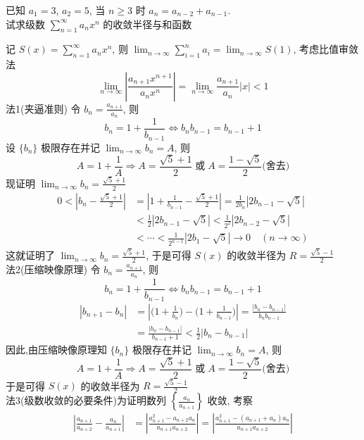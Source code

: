 \documentclass[color=green,titlestyle=hang]{elegantbook}%
\begin{document}
\begin{exercise}
已知 $a_1=3$, $a_2=5$, 当 $n\geqslant3$ 时 $a_n=a_{n-2}+a_{n-1}$. \\
试求级数 $\sum_{n=1}^{\infty}a_nx^n$ 的收敛半径与和函数 %
\end{exercise}\begin{solution}
记 $S(x)=\sum_{n=1}^{\infty}a_nx^n$, 则 $\lim_{n\to\infty}\sum_{i=1}^{n}a_i=\lim_{n\to\infty}S(1)$, 考虑比值审敛法
\[\lim_{n\to\infty}\left|\frac{a_{n+1}x^{n+1}}{a_nx^n}\right|=\lim_{n\to\infty}\frac{a_{n+1}}{a_n}|x|<1\]
法1(夹逼准则) 令 $b_n=\frac{a_{n+1}}{a_n}$, 则 
\[b_n=1+\frac{1}{b_{n-1}}\Longleftrightarrow b_nb_{n-1}=b_{n-1}+1\]
设 $\{b_n\}$ 极限存在并记 $\lim_{n\to\infty}b_n=A$, 则\[A=1+\frac{1}{A}\Longrightarrow A=\frac{\sqrt{5}+1}{2}\;\text{或}\;A=\frac{1-\sqrt{5}}{2}\text{(舍去)}\]
现证明  $\lim_{n\to\infty}b_n=\frac{\sqrt{5}+1}{2}$
\begin{align*}
0<\left|b_n-\frac{\sqrt{5}+1}{2}\right|&=\left|1+\frac{1}{b_{n-1}}-\frac{\sqrt{5}+1}{2}\right|
=\frac{1}{2b_n}\left|2b_{n-1}-\sqrt{5}\right|\\
&<\frac{1}{2}\left|2b_{n-1}-\sqrt{5}\right|<\frac{1}{2^2}\left|2b_{n-2}-\sqrt{5}\right|\\
&<\cdots<\frac{1}{2^{n-1}}\left|2b_{1}-\sqrt{5}\right|\to0\quad(n\to\infty)
\end{align*}
这就证明了 $\lim_{n\to\infty}b_n=\frac{\sqrt{5}+1}{2}$, 于是可得 $S(x)$ 的收敛半径为 $R=\frac{\sqrt{5}-1}{2}$\\
法2(压缩映像原理) 令 $b_n=\frac{a_{n+1}}{a_n}$, 则 
\[b_n=1+\frac{1}{b_{n-1}}\Longleftrightarrow b_nb_{n-1}=b_{n-1}+1\]
\begin{align*}
|b_{n+1}-b_n|&=\left|\Big(1+\frac{1}{b_{n}}\Big)-\Big(1+\frac{1}{b_{n-1}}\Big)\right|
=\frac{|b_n-b_{n-1}|}{b_nb_{n-1}}\\
&=\frac{|b_n-b_{n-1}|}{b_{n-1}+1}<\frac{1}{2}|b_n-b_{n-1}|
\end{align*}
因此,由压缩映像原理知 $\{b_n\}$ 极限存在并记 $\lim_{n\to\infty}b_n=A$, 则\[A=1+\frac{1}{A}\Longrightarrow A=\frac{\sqrt{5}+1}{2}\;\text{或}\;A=\frac{1-\sqrt{5}}{2}\text{(舍去)}\]
于是可得 $S(x)$ 的收敛半径为 $R=\frac{\sqrt{5}-1}{2}$\\
法3(级数收敛的必要条件)为证明数列 $\left\{\frac{a_{n}}{a_{n+1}}\right\}$ 收敛, 考察\\
\begin{align*}
\left|\frac{a_{n+1}}{a_{n+2}}-\frac{a_{n}}{a_{n+1}}\right|
&=\left|\frac{a_{n+1}^2-a_{n+2}a_n}{a_{n+1}a_{n+2}}\right|
=\left|\frac{a_{n+1}^2-(a_{n+1}+a_n)a_n}{a_{n+1}a_{n+2}}\right|\\

\end{align*}
\end{solution}
\end{document}
